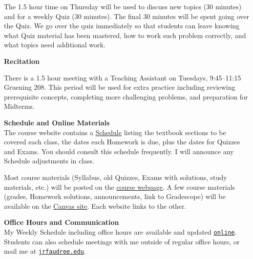 \documentclass[12pt]{article}
\renewcommand{\emph}[1]{\textsf{\textbf{#1}}}
\newcommand{\localhead}[1]{\par\smallskip\textbf{#1} \smallskip\nobreak\\}%
\def\heading#1{\localhead{\large\emph{#1}}}
\begin{document}
The 1.5 hour time on Thursday will be used to discuss new topics (30 minutes) and for a weekly Quiz (30 minutes).  The final 30 minutes will be spent going over the Quiz.  We go over the quiz immediately so that students can leave knowing what Quiz material has been mastered, how to work each problem correctly, and what topics need additional work. 

\clearpage\newpage

\strut \vspace{-12pt}

\heading{Recitation}

\vspace*{-0.3in}

There is a 1.5 hour meeting with a Teaching Assistant on Tuesdays, 9:45--11:15 Gruening 208. This period will be used for extra practice including reviewing prerequisite concepts, completing more challenging problems, and preparation for Midterms.



\heading{Schedule and Online Materials}
The course website contains a \href{https://docs.google.com/spreadsheets/d/e/2PACX-1vTJV11ILVouSFriJJQo6VS7-qBGvXBt6gtQNPTmmScJuiknursixGxHQf12yrBgwkJqETFn31EgQRia/pubhtml}{Schedule} listing the textbook sections to be covered each class, the dates each Homework is due, plus the dates for Quizzes and Exams. You should consult this schedule frequently.  I will announce any Schedule adjustments in class.

Most course materials (Syllabus, old Quizzes, Exams with solutions, study materials, etc.) will be posted on the \href{https://uaf-math251.github.io/calc2/}{course webpage}.  A few course materials (grades, Homework solutions, announcements, link to Gradescope) will be available on the \href{https://north.open.uaf.edu/login/}{Canvas site}.  Each website links to the other.


\heading{Office Hours and Communication}
My Weekly Schedule including office hours are available and updated \href{https://docs.google.com/spreadsheets/d/e/2PACX-1vSPkx0I1WQikJjmR8qs8wpf2oWcwO8CFS2VwCZYsdusMDkxTIQuOVwcV8LfAtsDtUGoj49xCS1mOIrW/pubhtml}{\texttt{online}}.  Students can also schedule meetings with me outside of regular office hours, or mail me at \href{mailto:jrfaudree@alaska.edu}{\texttt{jrfaudree\@@alaska.edu}}.
\end{document}
